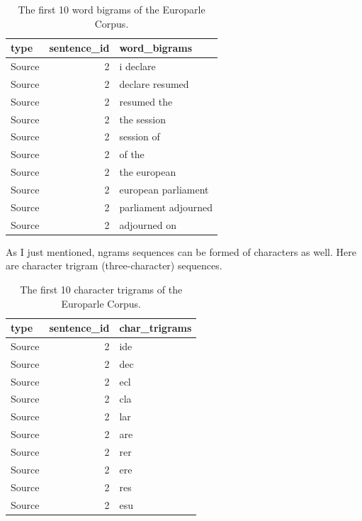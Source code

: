 \documentclass[
  letterpaper,
]{scrbook}
\begin{document}
\hypertarget{tbl-recoding-tokenization-europarle-bigram-words}{}
\begin{table}
\caption{\label{tbl-recoding-tokenization-europarle-bigram-words}The first 10 word bigrams of the Europarle Corpus. }\tabularnewline

\centering
\begin{tabular}{lrl}
\toprule
type & sentence\_id & word\_bigrams\\
\midrule
Source & 2 & i declare\\
Source & 2 & declare resumed\\
Source & 2 & resumed the\\
Source & 2 & the session\\
Source & 2 & session of\\
\addlinespace
Source & 2 & of the\\
Source & 2 & the european\\
Source & 2 & european parliament\\
Source & 2 & parliament adjourned\\
Source & 2 & adjourned on\\
\bottomrule
\end{tabular}
\end{table}

As I just mentioned, ngrams sequences can be formed of characters as
well. Here are character trigram (three-character) sequences.

\hypertarget{tbl-recoding-tokenization-europarle-trigram-chars}{}
\begin{table}
\caption{\label{tbl-recoding-tokenization-europarle-trigram-chars}The first 10 character trigrams of the Europarle Corpus. }\tabularnewline

\centering
\begin{tabular}{lrl}
\toprule
type & sentence\_id & char\_trigrams\\
\midrule
Source & 2 & ide\\
Source & 2 & dec\\
Source & 2 & ecl\\
Source & 2 & cla\\
Source & 2 & lar\\
\addlinespace
Source & 2 & are\\
Source & 2 & rer\\
Source & 2 & ere\\
Source & 2 & res\\
Source & 2 & esu\\
\bottomrule
\end{tabular}
\end{table}
\end{document}
